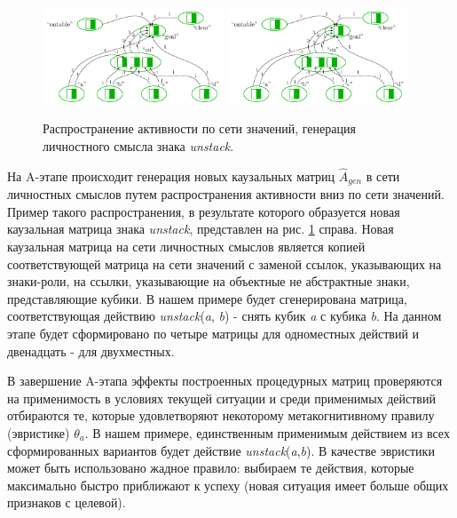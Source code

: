 \documentclass[12pt]{scrartcl}
\begin{document}
	\begin{figure}
		\centering
		\includegraphics[width=0.48\textwidth,page=5]{examples/plan/plan_nets}
		\includegraphics[width=0.48\textwidth,page=4]{examples/plan/plan_nets}
		\caption{Распространение активности по сети значений, генерация личностного смысла знака \textit{unstack}.}	
		\label{fig:unstack_gen}	
	\end{figure}

	На A-этапе происходит генерация новых каузальных матриц $\hat A_{gen}$ в сети личностных смыслов путем распространения активности вниз по сети значений. Пример такого распространения, в результате которого образуется новая каузальная матрица знака \textit{unstack}, представлен на рис. \ref{fig:unstack_gen} справа. Новая каузальная матрица на сети личностных смыслов является копией соответствующей матрица на сети значений с заменой ссылок, указывающих на знаки-роли, на ссылки, указывающие на объектные не абстрактные знаки, представляющие кубики. В нашем примере будет сгенерирована матрица, соответствующая действию \textit{unstack}(\textit{a}, \textit{b}) - снять кубик \textit{a} с кубика \textit{b}. На данном этапе будет сформировано по четыре матрицы для одноместных действий и двенадцать - для двухместных.
	
	В завершение A-этапа эффекты построенных процедурных матриц проверяются на применимость в условиях текущей ситуации и среди применимых действий отбираются те, которые удовлетворяют некоторому метакогнитивному правилу (эвристике) $\theta_a$. В нашем примере, единственным применимым действием из всех сформированных вариантов будет действие \textit{unstack}(\textit{a},\textit{b}). В качестве эвристики может быть использовано жадное правило: выбираем те действия, которые максимально быстро приближают к успеху (новая ситуация имеет больше общих признаков с целевой).
	
\end{document}
